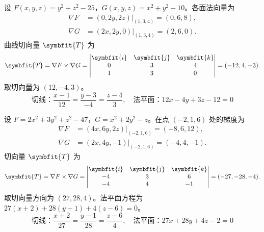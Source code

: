 \begin{solution}

    设 $F(x, y, z) = y^2 + z^2 - 25$，$G(x, y, z) = x^2 + y^2 - 10$。各面法向量为
    \begin{equation}
        \begin{aligned}
            \nabla F & = (0, 2y, 2z) \big|_{(1, 3, 4)} = (0, 6, 8), \\
            \nabla G & = (2x, 2y, 0) \big|_{(1, 3, 4)} = (2, 6, 0).
        \end{aligned}
    \end{equation}
    曲线切向量 $\symbfit{T}$ 为
    \begin{equation}
        \symbfit{T} = \nabla F \times \nabla G = \begin{vmatrix} \symbfit{i} & \symbfit{j} & \symbfit{k} \\ 0 & 3 & 4 \\ 1 & 3 & 0 \end{vmatrix} = (-12, 4, -3).
    \end{equation}
    取切向量为 $(12, -4, 3)$。
    \begin{equation}
        \boxed{\text{切线：} \frac{x-1}{12} = \frac{y-3}{-4} = \frac{z-4}{3}, \quad \text{法平面：} 12x - 4y + 3z - 12 = 0}
    \end{equation}


    设 $F = 2x^2 + 3y^2 + z^2 - 47$，$G = x^2 + 2y^2 - z$。在点 $(-2, 1, 6)$ 处的梯度为
    \begin{equation}
        \begin{aligned}
            \nabla F & = (4x, 6y, 2z) \big|_{(-2, 1, 6)} = (-8, 6, 12), \\
            \nabla G & = (2x, 4y, -1) \big|_{(-2, 1, 6)} = (-4, 4, -1).
        \end{aligned}
    \end{equation}
    切向量 $\symbfit{T}$ 为
    \begin{equation}
        \symbfit{T} = \nabla F \times \nabla G = \begin{vmatrix} \symbfit{i} & \symbfit{j} & \symbfit{k} \\ -4 & 3 & 6 \\ -4 & 4 & -1 \end{vmatrix} = (-27, -28, -4).
    \end{equation}
    取切向量方向为 $(27, 28, 4)$。法平面方程为 $27(x+2) + 28(y-1) + 4(z-6) = 0$。
    \begin{equation}
        \boxed{\text{切线：} \frac{x+2}{27} = \frac{y-1}{28} = \frac{z-6}{4}, \quad \text{法平面：} 27x + 28y + 4z - 2 = 0}
    \end{equation}
\end{solution}

